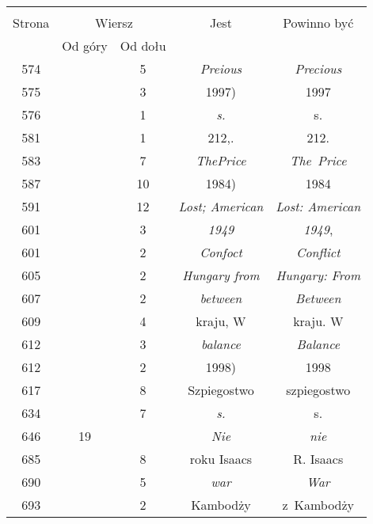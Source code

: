 \documentclass[a4paper,11pt]{article}
\begin{document}
\begin{center}
  \begin{tabular}{|c|c|c|c|c|}
    \hline
    & \multicolumn{2}{c|}{} & & \\
    Strona & \multicolumn{2}{c|}{Wiersz} & Jest
                              & Powinno być \\ \cline{2-3}
    & Od góry & Od dołu & & \\
    \hline
    574 & &  5 & \textit{Preious} & \textit{Precious} \\
    575 & &  3 & 1997) & 1997 \\
    576 & &  1 & \emph{s.} & s. \\
    581 & &  1 & 212,. & 212. \\
    583 & &  7 & \textit{ThePrice} & \textit{The~Price} \\
    587 & & 10 & 1984) & 1984 \\
    591 & & 12 & \textit{Lost; American} & \textit{Lost: American} \\
    601 & &  3 & \textit{1949} & \textit{1949}, \\
    601 & &  2 & \textit{Confoct} & \textit{Conflict} \\
    605 & &  2 & \textit{Hungary from} & \textit{Hungary: From} \\
    607 & &  2 & \textit{between} & \textit{Between} \\
    609 & &  4 & kraju, W & kraju. W \\
    612 & &  3 & \textit{balance} & \textit{Balance} \\
    612 & &  2 & 1998) & 1998 \\
    617 & &  8 & Szpiegostwo & szpiegostwo \\
    634 & &  7 & \textit{s.} & s. \\
    646 & 19 & & \textit{Nie} & \textit{nie} \\
    685 & &  8 & roku Isaacs & R. Isaacs \\
    690 & &  5 & \textit{war} & \textit{War} \\
    693 & &  2 & Kambodży & z~Kambodży \\
    \hline
  \end{tabular}






\end{center}
\end{document}
